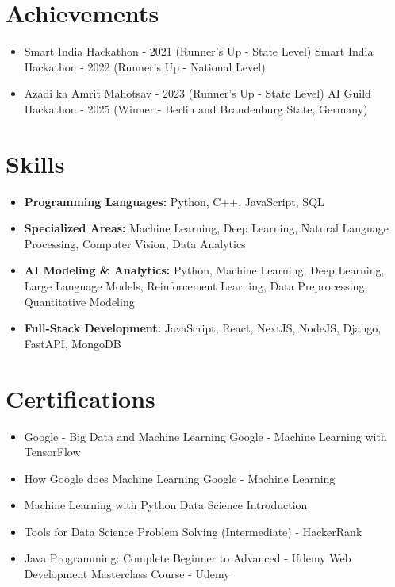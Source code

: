 \documentclass[a4paper,10pt]{article}
\begin{document}
\section*{Achievements}
\begin{itemize}
\item Smart India Hackathon - 2021 (Runner's Up - State Level) \hfill Smart India Hackathon - 2022 (Runner's Up - National Level)
\item Azadi ka Amrit Mahotsav - 2023 (Runner's Up - State Level) \hfill AI Guild Hackathon - 2025 (Winner - Berlin and Brandenburg State, Germany)
\end{itemize}

\section*{Skills}
\begin{itemize}
  \item \textbf{Programming Languages:} Python, C++, JavaScript, SQL
  \item \textbf{Specialized Areas:} Machine Learning, Deep Learning, Natural Language Processing, Computer Vision, Data Analytics
  \item \textbf{AI Modeling \& Analytics:} Python, Machine Learning, Deep Learning, Large Language Models, Reinforcement Learning, Data Preprocessing, Quantitative Modeling
  \item \textbf{Full-Stack Development:} JavaScript, React, NextJS, NodeJS, Django, FastAPI, MongoDB
\end{itemize}

\section*{Certifications}
\begin{itemize}
\item Google - Big Data and Machine Learning \hfill Google - Machine Learning with TensorFlow
\item How Google does Machine Learning \hfill Google - Machine Learning
\item Machine Learning with Python \hfill Data Science Introduction
\item Tools for Data Science \hfill Problem Solving (Intermediate) - HackerRank
\item Java Programming: Complete Beginner to Advanced - Udemy \hfill Web Development Masterclass Course - Udemy
\end{itemize}
\end{document}

